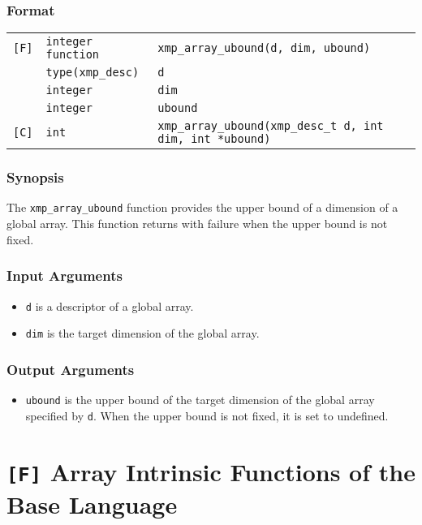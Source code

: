 \subsubsection*{Format}

\begin{tabular}{lll}

\verb![F]!& {\tt integer function}& {\tt xmp\_array\_ubound(d, dim, ubound)}\\
          & {\tt type(xmp\_desc)} & {\tt d}\\
          & {\tt integer} & {\tt dim}\\
          & {\tt integer} & {\tt ubound}\\

\verb![C]!&  {\tt int}& {\tt xmp\_array\_ubound(xmp\_desc\_t d, int dim, int *ubound)}\\

\end{tabular}

\subsubsection*{Synopsis}

The {\tt xmp\_array\_ubound} function provides the upper bound of a
dimension of a global array. This function returns with failure when the
upper bound is not fixed.

\subsubsection*{Input Arguments}
\begin{itemize}
 \item {\tt d} is a descriptor of a global array.
 \item {\tt dim} is the target dimension of the global array.
\end{itemize}

\subsubsection*{Output Arguments}
\begin{itemize}
 \item {\tt ubound} is the upper bound of the target dimension of the
       global array specified by {\tt d}. When the upper bound is not
       fixed, it is set to undefined.
\end{itemize}

\section{{\tt [F]} Array Intrinsic Functions of the Base Language}

